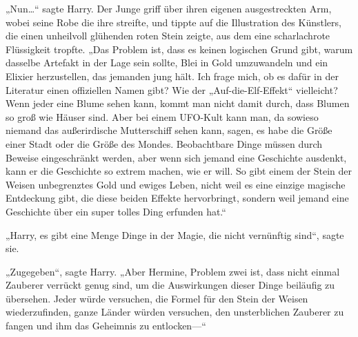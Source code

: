 „Nun…“ sagte Harry.
Der Junge griff über ihren eigenen ausgestreckten Arm, wobei seine Robe die ihre streifte, und tippte auf die Illustration des Künstlers, die einen unheilvoll glühenden roten Stein zeigte, aus dem eine scharlachrote Flüssigkeit tropfte.
„Das Problem ist, dass es keinen logischen Grund gibt, warum dasselbe Artefakt in der Lage sein sollte, Blei in Gold umzuwandeln und ein Elixier herzustellen, das jemanden jung hält. Ich frage mich, ob es dafür in der Literatur einen offiziellen Namen gibt? Wie der „Auf-die-Elf-Effekt“ vielleicht? Wenn jeder eine Blume sehen kann, kommt man nicht damit durch, dass Blumen so groß wie Häuser sind. Aber bei einem UFO-Kult kann man, da sowieso niemand das außerirdische Mutterschiff sehen kann, sagen, es habe die Größe einer Stadt oder die Größe des Mondes. Beobachtbare Dinge müssen durch Beweise eingeschränkt werden, aber wenn sich jemand eine Geschichte ausdenkt, kann er die Geschichte so extrem machen, wie er will. So gibt einem der Stein der Weisen unbegrenztes Gold und ewiges Leben, nicht weil es eine einzige magische Entdeckung gibt, die diese beiden Effekte hervorbringt, sondern weil jemand eine Geschichte über ein super tolles Ding erfunden hat.“

„Harry, es gibt eine Menge Dinge in der Magie, die nicht vernünftig sind“, sagte sie.

„Zugegeben“, sagte Harry. „Aber Hermine, Problem zwei ist, dass nicht einmal Zauberer verrückt genug sind, um die Auswirkungen dieser Dinge beiläufig zu übersehen. Jeder würde versuchen, die Formel für den Stein der Weisen wiederzufinden, ganze Länder würden versuchen, den unsterblichen Zauberer zu fangen und ihm das Geheimnis zu entlocken—“

